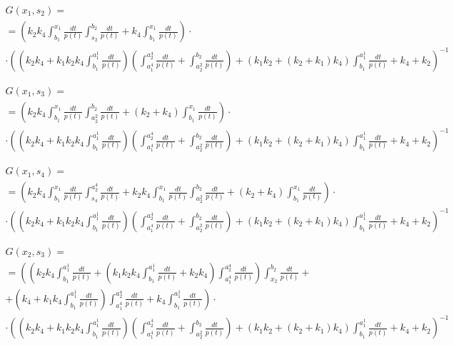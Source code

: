 \documentclass[a4paper,12pt]{article} %
\begin{document}
\begin{multline}
	G(x_1,s_2)=\\=
	\left(
		k_2 k_4 \int_{b_1}^{x_1}\frac{dt}{p(t)} \int_{s_2}^{b_2}\frac{dt}{p(t)}+k_4 \int_{b_1}^{x_1}\frac{dt}{p(t)}
	\right) \cdot \\ \cdot \left(
		\left( k_2 k_4+k_1 k_2 k_4 \int_{b_1}^{a_1^1}\frac{dt}{p(t)}\right)
		\left( \int_{a_1^4}^{a_2^4}\frac{dt}{p(t)}+ \int_{a_2^2}^{b_2}\frac{dt}{p(t)} \right)+
		\left( k_1 k_2+\left( k_2+k_1\right)  k_4\right)  \int_{b_1}^{a_1^1}\frac{dt}{p(t)}+k_4+k_2
	\right)^{-1}
\end{multline}

\begin{multline}
	G(x_1,s_3)=\\=
	\left(
		k_2 k_4 \int_{b_1}^{x_1}\frac{dt}{p(t)} \int_{a_2^2}^{b_2}\frac{dt}{p(t)}+\left( k_2+k_4\right)  \int_{b_1}^{x_1}\frac{dt}{p(t)}
	\right) \cdot \\ \cdot \left(
		\left( k_2 k_4+k_1 k_2 k_4 \int_{b_1}^{a_1^1}\frac{dt}{p(t)}\right)
		\left( \int_{a_1^4}^{a_2^4}\frac{dt}{p(t)}+ \int_{a_2^2}^{b_2}\frac{dt}{p(t)} \right)+
		\left( k_1 k_2+\left( k_2+k_1\right)  k_4\right)  \int_{b_1}^{a_1^1}\frac{dt}{p(t)}+k_4+k_2
	\right)^{-1}
\end{multline}

\begin{multline}
	G(x_1,s_4)=\\=
	\left(
		k_2 k_4 \int_{b_1}^{x_1}\frac{dt}{p(t)} \int_{s_4}^{a_2^4}\frac{dt}{p(t)}+k_2 k_4 \int_{b_1}^{x_1}\frac{dt}{p(t)} \int_{a_2^2}^{b_2}\frac{dt}{p(t)}+\left( k_2+k_4\right)  \int_{b_1}^{x_1}\frac{dt}{p(t)}
	\right) \cdot \\ \cdot \left(
		\left( k_2 k_4+k_1 k_2 k_4 \int_{b_1}^{a_1^1}\frac{dt}{p(t)}\right)
		\left( \int_{a_1^4}^{a_2^4}\frac{dt}{p(t)}+ \int_{a_2^2}^{b_2}\frac{dt}{p(t)} \right)+
		\left( k_1 k_2+\left( k_2+k_1\right)  k_4\right)  \int_{b_1}^{a_1^1}\frac{dt}{p(t)}+k_4+k_2
	\right)^{-1}
\end{multline}

\begin{multline}
	G(x_2,s_3)=\\=
	\left(
		\left( k_2 k_4 \int_{b_1}^{a_1^1}\frac{dt}{p(t)}+\left( k_1 k_2 k_4 \int_{b_1}^{a_1^1}\frac{dt}{p(t)}+
		k_2 k_4\right)  \int_{a_1^4}^{a_2^4}\frac{dt}{p(t)}\right)  \int_{x_2}^{b_2}\frac{dt}{p(t)}
		\right. + \\ + \left.
		\left( k_4+k_1 k_4 \int_{b_1}^{a_1^1}\frac{dt}{p(t)}\right)  \int_{a_1^4}^{a_2^4}\frac{dt}{p(t)}+k_4 \int_{b_1}^{a_1^1}\frac{dt}{p(t)}
	\right) \cdot \\ \cdot \left(
		\left( k_2 k_4+k_1 k_2 k_4 \int_{b_1}^{a_1^1}\frac{dt}{p(t)}\right)
		\left( \int_{a_1^4}^{a_2^4}\frac{dt}{p(t)}+ \int_{a_2^2}^{b_2}\frac{dt}{p(t)} \right)+
		\left( k_1 k_2+\left( k_2+k_1\right)  k_4\right)  \int_{b_1}^{a_1^1}\frac{dt}{p(t)}+k_4+k_2
	\right)^{-1}
\end{multline}
\end{document}
